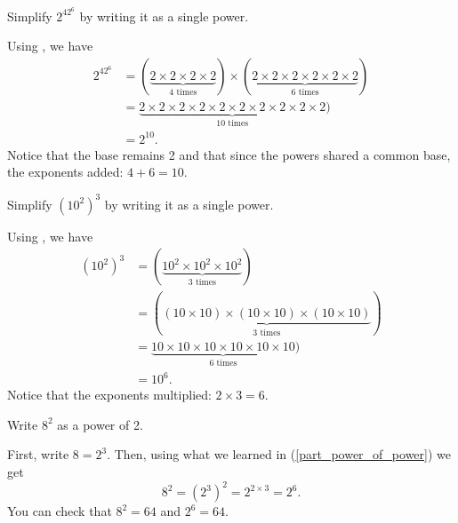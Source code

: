 \begin{exam}
\label{exam_simplify_exponents}
~
     \begin{apart}
         \item Simplify $2^42^6$ by writing it as a single power.
             \begin{soln}
                 Using , we have
                     \begin{align*}
                         2^42^6 &= (\underbrace{2\times 2\times 2 \times 2}_{4 \text{ times}}) \times
                         (\underbrace{2\times 2\times 2 \times 2 \times 2 \times 2}_{6 \text{ times}}) \\
                         &= \underbrace{2\times 2\times 2\times 2\times 2 \times 2 \times 2 \times 2 \times 2 \times 2}_{10 \text{ times}}) \\ 
                         &= 2^{10}.
                    \end{align*}
                Notice that the base remains 2 and that since the powers shared a common base, the exponents added: $4+6=10$.
             \end{soln}
        \item \label{part_power_of_power} Simplify $(10^2)^3$ by writing it as a single power.
            \begin{soln}
                Using , we have
                     \begin{align*}
                         (10^2)^3 &= (\underbrace{10^2\times 10^2\times 10^2}_{3 \text{ times}}) \\
                         &= (\underbrace{(10 \times 10)\times (10 \times 10)\times (10 \times 10)}_{3 \text{ times}}) \\
                         &= \underbrace{10\times 10\times 10\times 10\times 10 \times 10}_{6 \text{ times}}) \\ 
                         &= 10^6.
                    \end{align*}
                Notice that the exponents multiplied: $2 \times 3=6$.
            \end{soln}
        \item Write $8^2$ as a power of 2.
            \begin{soln}
                First, write $8 = 2^3$.  Then, using what we learned in (\ref{part_power_of_power}) we get
                    $$8^2=\left(2^3\right)^2 = 2^{2\times 3}=2^6.$$
                You can check that $8^2=64$ and $2^6=64$.
            \end{soln}
     \end{apart}
\end{exam}

